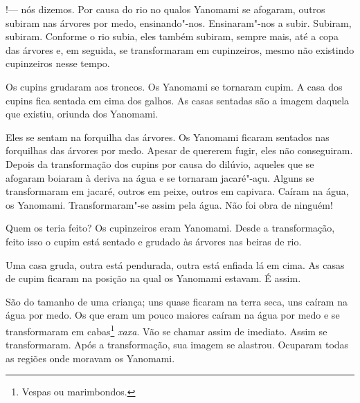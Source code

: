 

!--- nós dizemos. 
Por causa do rio no qualos Yanomami se afogaram, outros subiram nas
árvores por medo, ensinando"-nos. Ensinaram"-nos a subir. Subiram,
subiram. Conforme o rio subia, eles também subiram, sempre mais, até a
copa das árvores e, em seguida, se transformaram em cupinzeiros, mesmo
não existindo cupinzeiros nesse tempo. 

Os cupins grudaram aos troncos. Os Yanomami se tornaram cupim. A casa
dos cupins fica sentada em cima dos galhos. As casas sentadas são a
imagem daquela que existiu, oriunda dos Yanomami. 

Eles se sentam na forquilha das árvores. Os Yanomami ficaram sentados
nas forquilhas das árvores por medo. Apesar de quererem fugir, eles não
conseguiram. Depois da transformação dos cupins por causa do dilúvio,
aqueles que se afogaram boiaram à deriva na água e se tornaram
jacaré"-açu. Alguns se transformaram em jacaré, outros em peixe, outros
em capivara. Caíram na água, os {Yanomami}. Transformaram"-se
assim pela água. Não foi obra de ninguém! 

Quem os teria feito? Os cupinzeiros eram {Yanomami}. Desde a
transformação, feito isso o cupim está sentado e grudado às árvores nas
beiras de rio.

Uma casa gruda, outra está pendurada, outra está enfiada lá em cima. As
casas de cupim ficaram na posição na qual os {Yanomami} estavam.
É assim. 

São do tamanho de uma criança; uns quase ficaram na terra seca, uns
caíram na água por medo. Os que eram um pouco maiores caíram na água por
medo e se transformaram em cabas\footnote{ Vespas ou marimbondos.}  \emph{xaxa}. Vão se
chamar assim de imediato. Assim se transformaram. Após a transformação,
sua imagem se alastrou. Ocuparam todas as regiões onde moravam os
Yanomami. 

 

 

 
